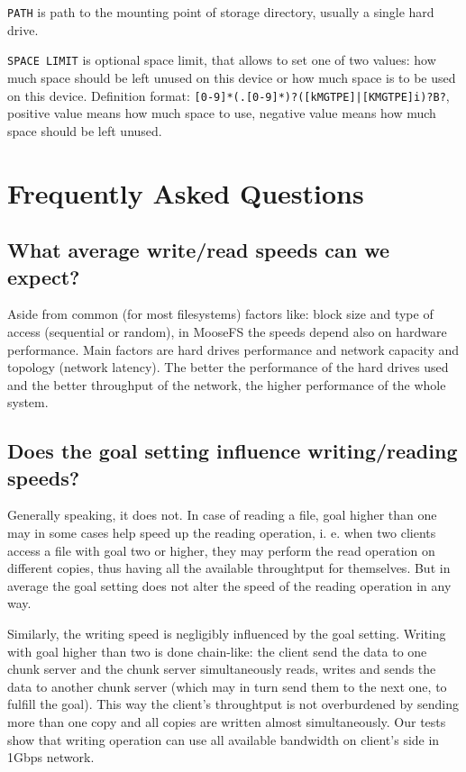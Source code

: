 \documentclass[a4paper,11pt,english]{report}
\def\code#1{\texttt{#1}}
\begin{document}
				\code{PATH} is path to the mounting point of storage directory, usually
				a single hard drive.

				\code{SPACE LIMIT} is optional space limit, that allows to set one of two
				values: how much space should be left unused on this device  or  how  much
				space   is   to   be   used   on   this   device.   Definition  format:
				\code{[0-9]*(.[0-9]*)?([kMGTPE]|[KMGTPE]i)?B?}, positive value means how  much
				space  to  use,  negative  value  means  how  much space should be left
				unused.

			

	\chapter{Frequently Asked Questions}
		\section{What average write/read speeds can we expect?}
		Aside from common (for most filesystems) factors like: block size and type of access (sequential or random), in MooseFS the speeds depend also on hardware performance. Main factors are hard drives performance and network capacity and topology (network latency). The better the performance of the hard drives used and the better throughput of the network, the higher performance of the whole system.

		\section{Does the goal setting influence writing/reading speeds?}
		Generally speaking, it does not. In case of reading a file, goal higher than one may in some cases help speed up the reading operation, i. e. when two clients access a file with goal two or higher, they may perform the read operation on different copies, thus having all the available throughtput for themselves. But in average the goal setting does not alter the speed of the reading operation in any way.
				
		Similarly, the writing speed is negligibly influenced by the goal setting. Writing with goal higher than two is done chain-like: the client send the data to one chunk server and the chunk server simultaneously reads, writes and sends the data to another chunk server (which may in turn send them to the next one, to fulfill the goal). This way the client's throughtput is not overburdened by sending more than one copy and all copies are written almost simultaneously. Our tests show that writing operation can use all available bandwidth on client's side in 1Gbps network.
\end{document}

